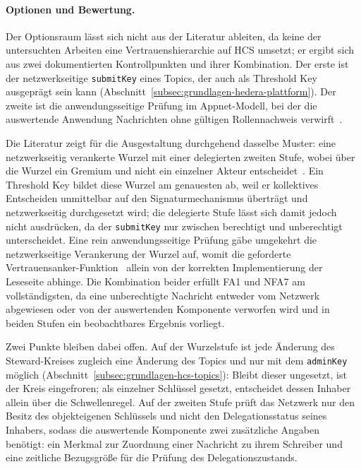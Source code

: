 \paragraph{Optionen und Bewertung.}
Der Optionsraum lässt sich nicht aus der Literatur ableiten, da keine der untersuchten Arbeiten eine Vertrauenshierarchie auf HCS umsetzt; er ergibt sich aus zwei dokumentierten Kontrollpunkten und ihrer Kombination. Der erste ist der netzwerkseitige \texttt{submitKey} eines Topics, der auch als Threshold Key ausgeprägt sein kann (Abschnitt~\ref{subsec:grundlagen-hedera-plattform}). Der zweite ist die anwendungsseitige Prüfung im Appnet-Modell, bei der die auswertende Anwendung Nachrichten ohne gültigen Rollennachweis verwirft~\cite{bairdgross2019}.

Die Literatur zeigt für die Ausgestaltung durchgehend dasselbe Muster: eine netzwerkseitig verankerte Wurzel mit einer delegierten zweiten Stufe, wobei über die Wurzel ein Gremium und nicht ein einzelner Akteur entscheidet~\cite{torongo2023, manoj2022, joshimahajan2025, tawfik2025}. Ein Threshold Key bildet diese Wurzel am genauesten ab, weil er kollektives Entscheiden unmittelbar auf den Signaturmechanismus überträgt und netzwerkseitig durchgesetzt wird; die delegierte Stufe lässt sich damit jedoch nicht ausdrücken, da der \texttt{submitKey} nur zwischen berechtigt und unberechtigt unterscheidet. Eine rein anwendungsseitige Prüfung gäbe umgekehrt die netzwerkseitige Verankerung der Wurzel auf, womit die geforderte Vertrauensanker-Funktion~\cite{erler2023} allein von der korrekten Implementierung der Leseseite abhinge. Die Kombination beider erfüllt FA1 und NFA7 am vollständigsten, da eine unberechtigte Nachricht entweder vom Netzwerk abgewiesen oder von der auswertenden Komponente verworfen wird und in beiden Stufen ein beobachtbares Ergebnis vorliegt.

Zwei Punkte bleiben dabei offen. Auf der Wurzelstufe ist jede Änderung des Steward-Kreises zugleich eine Änderung des Topics und nur mit dem \texttt{adminKey} möglich (Abschnitt~\ref{subsec:grundlagen-hcs-topics}): Bleibt dieser ungesetzt, ist der Kreis eingefroren; als einzelner Schlüssel gesetzt, entscheidet dessen Inhaber allein über die Schwellenregel. Auf der zweiten Stufe prüft das Netzwerk nur den Besitz des objekteigenen Schlüssels und nicht den Delegationsstatus seines Inhabers, sodass die auswertende Komponente zwei zusätzliche Angaben benötigt: ein Merkmal zur Zuordnung einer Nachricht zu ihrem Schreiber und eine zeitliche Bezugsgröße für die Prüfung des Delegationszustands.

